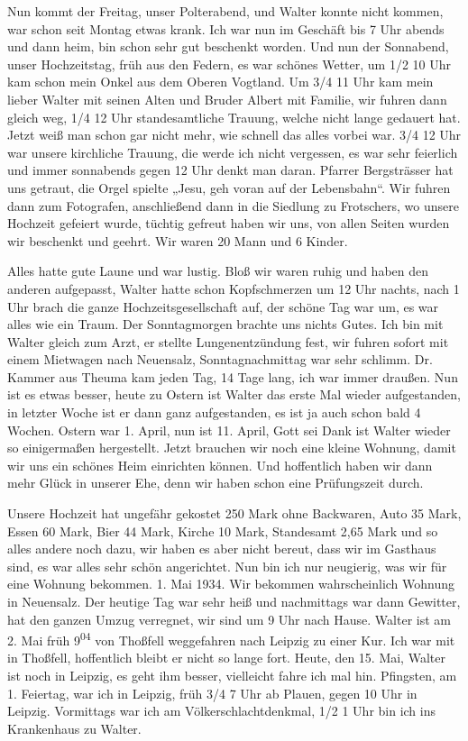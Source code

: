 \documentclass[a5paper,11pt,openany]{book}
\newcommand{\seite}[1]{\leavevmode\marginpar{\footnotesize\itshape\raggedright #1}\ignorespaces}
\begin{document}
\seite{30}
Nun kommt der Freitag, unser Polterabend, und Walter konnte nicht kommen,
  war schon seit Montag etwas krank.
Ich war nun im Geschäft bis 7 Uhr abends und dann heim,
  bin schon sehr gut beschenkt worden.
Und nun der Sonnabend, unser Hochzeitstag, früh aus den Federn,
  es war schönes Wetter, um 1/2 10 Uhr kam schon mein Onkel aus dem Oberen Vogtland.
Um 3/4 11 Uhr kam mein lieber Walter mit seinen Alten und Bruder Albert mit Familie,
  wir fuhren dann gleich weg, 1/4 12 Uhr standesamtliche Trauung, welche nicht lange gedauert hat.
Jetzt weiß
\seite{31}
man schon gar nicht mehr, wie schnell das alles vorbei war.
3/4 12 Uhr war unsere kirchliche Trauung, die werde ich nicht vergessen,
  es war sehr feierlich und immer sonnabends gegen 12 Uhr denkt man daran.
Pfarrer Bergsträsser hat uns getraut, die Orgel spielte „Jesu, geh voran auf der Lebensbahn“.
Wir fuhren dann zum Fotografen, anschließend dann in die Siedlung zu Frotschers, wo unsere Hochzeit gefeiert wurde,
  tüchtig gefreut haben wir uns, von allen Seiten wurden wir beschenkt und geehrt.
Wir waren 20 Mann und 6 Kinder.

\seite{32}
Alles hatte gute Laune und war lustig.
Bloß wir waren ruhig und haben den anderen aufgepasst, Walter hatte schon Kopfschmerzen um 12 Uhr nachts,
  nach 1 Uhr brach die ganze Hochzeitsgesellschaft auf, der schöne Tag war um, es war alles wie ein Traum.
Der Sonntagmorgen brachte uns nichts Gutes.
Ich bin mit Walter gleich zum Arzt, er stellte Lungenentzündung fest,
  wir fuhren sofort mit einem Mietwagen nach Neuensalz, Sonntagnachmittag war sehr schlimm.
Dr. Kammer aus Theuma kam jeden Tag, 14 Tage
\seite{33}
lang, ich war immer draußen.
Nun ist es etwas besser, heute zu Ostern ist Walter das erste Mal wieder aufgestanden,
  in letzter Woche ist er dann ganz aufgestanden,
  es ist ja auch schon bald 4 Wochen.
Ostern war 1. April, nun ist 11. April, Gott sei Dank ist Walter wieder so einigermaßen hergestellt.
Jetzt brauchen wir noch eine kleine Wohnung, damit wir uns ein schönes Heim einrichten können.
Und hoffentlich haben wir dann mehr Glück in unserer Ehe, denn wir haben schon eine Prüfungszeit durch.

\seite{34}
Unsere Hochzeit hat ungefähr gekostet 250 Mark ohne Backwaren,
  Auto 35 Mark,
  Essen 60 Mark,
  Bier 44 Mark,
  Kirche 10 Mark,
  Standesamt 2,65 Mark und so alles andere noch dazu, wir haben es aber nicht bereut, dass wir im Gasthaus sind,
  es war alles sehr schön angerichtet.
Nun bin ich nur neugierig, was wir für eine Wohnung bekommen.
1. Mai 1934.
Wir bekommen wahrscheinlich Wohnung in Neuensalz.
Der heutige Tag war sehr heiß und nachmittags war dann Gewitter, hat den ganzen Umzug
\seite{35}
verregnet, wir sind um 9 Uhr nach Hause.
Walter ist am 2. Mai früh 9\textsuperscript{04} von Thoßfell weggefahren nach Leipzig zu einer Kur.
Ich war mit in Thoßfell, hoffentlich bleibt er nicht so lange fort.
Heute, den 15. Mai, Walter ist noch in Leipzig, es geht ihm besser, vielleicht fahre ich mal hin.
Pfingsten, am 1. Feiertag, war ich in Leipzig, früh 3/4 7 Uhr ab Plauen, gegen 10 Uhr in Leipzig.
Vormittags war ich am Völkerschlachtdenkmal, 1/2 1 Uhr bin ich ins Krankenhaus zu Walter.
\end{document}
